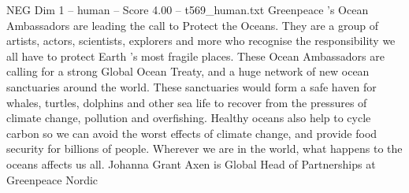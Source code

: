\begin{textsample}{NEG Dim 1 – human – Score 4.00 – t569\_human.txt}  \label{ex:f1_neg_046}
Greenpeace ’s Ocean Ambassadors are leading the call to Protect the Oceans.
They are a group of artists, actors, scientists, explorers and more who recognise the responsibility we all have to protect Earth ’s most fragile places.
These Ocean Ambassadors are calling for a strong Global Ocean Treaty, and a huge network of new ocean sanctuaries around the world.
These sanctuaries would form a safe haven for whales, turtles, dolphins and other sea life to recover from the pressures of climate change, pollution and overfishing.
Healthy oceans also help to cycle carbon so we can avoid the worst effects of climate change, and provide food security for billions of people.
Wherever we are in the world, what happens to the oceans affects us all.
Johanna Grant Axen is Global Head of Partnerships at Greenpeace Nordic

\end{textsample}

